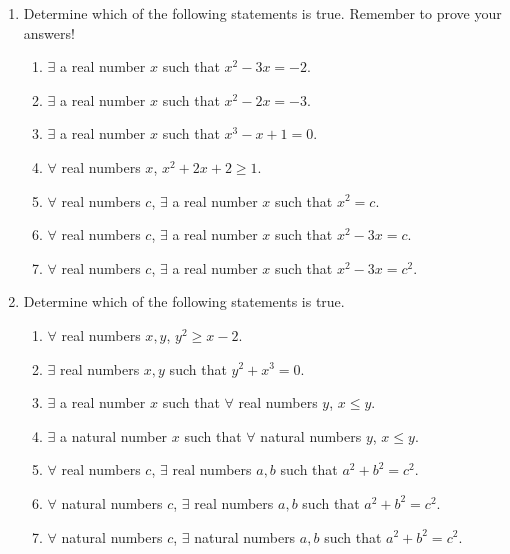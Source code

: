 \probsec{~\ref{sec:quantifiers}}
\begin{enumerate} %
    \item Determine which of the following statements is true. Remember to prove your answers! 
  \begin{enumerate}
      \item $\exists$ a real number $x$ such that $x^2 - 3x = -2$.
      \item $\exists$ a real number $x$ such that $x^2 - 2x = -3$.
      \item $\exists$ a real number $x$ such that $x^3 - x + 1 = 0$.
      \item $\forall$ real numbers $x$, $x^2 + 2x + 2 \geq 1$.
      \item $\forall$ real numbers $c$, $\exists$ a real number $x$ such that $x^2 = c$.
      \item $\forall$ real numbers $c$, $\exists$ a real number $x$ such that $x^2 - 3x = c$.
      \item $\forall$ real numbers $c$, $\exists$ a real number $x$ such that $x^2 - 3x = c^2$.
  \end{enumerate}

    \item Determine which of the following statements is true.
  \begin{enumerate}
      \item $\forall$ real numbers $x, y$, $y^2 \geq x - 2$.
      \item $\exists$ real numbers $x, y$ such that $y^2 + x^3 = 0$.
      \item $\exists$ a real number $x$ such that $\forall$ real numbers $y$, $x \leq y$.
      \item $\exists$ a natural number $x$ such that $\forall$ natural numbers $y$, $x \leq y$.
      \item $\forall$ real numbers $c$, $\exists$ real numbers $a, b$ such that $a^2 + b^2 = c^2$.
      \item $\forall$ natural numbers $c$, $\exists$ real numbers $a, b$ such that $a^2 + b^2 = c^2$.
      \item $\forall$ natural numbers $c$, $\exists$ natural numbers $a, b$ such that $a^2 + b^2 = c^2$.
  \end{enumerate}
\end{enumerate}
